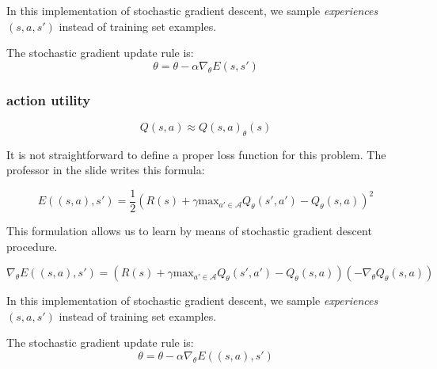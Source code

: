 In this implementation of stochastic gradient descent, we sample \textit{experiences}
$(s,a,s')$ instead of training set examples.
\newline

The stochastic gradient update rule is:
\begin{equation}
	\theta = \theta - \alpha \nabla_{\theta}E(s, s')
\end{equation}

\subsubsection{action utility}
\begin{equation}
	Q(s,a) \approx Q(s,a)_{\theta}(s)
\end{equation}

It is not straightforward to define a proper loss function for this problem. The
professor in the slide writes this formula:

\begin{equation}
	E((s,a),s') = \frac{1}{2}(R(s) + \gamma \text{max}_{a' \in \mathcal{A}}Q_{\theta}
	(s', a') - Q_{\theta}(s,a))^{2}
\end{equation}

This formulation allows us to learn by means of stochastic gradient descent procedure.

\begin{equation}
	\nabla_{\theta}E((s,a),s') = (R(s) + \gamma \text{max}_{a' \in \mathcal{A}}Q_{\theta}
	(s', a') - Q_{\theta}(s,a)) (- \nabla_{\theta}Q_{\theta}(s,a))
\end{equation}

In this implementation of stochastic gradient descent, we sample \textit{experiences}
$(s,a,s')$ instead of training set examples.
\newline

The stochastic gradient update rule is:
\begin{equation}
	\theta = \theta - \alpha \nabla_{\theta}E((s,a), s')
\end{equation}